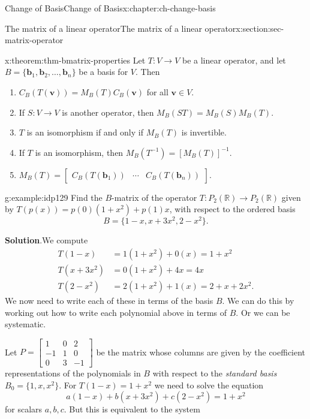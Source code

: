 \documentclass[oneside,10pt,]{book}
\newcommand{\blocktitlefont}{\relax}
\numberwithin{equation}{section}
\newcommand{\bbm}{\begin{bmatrix}}
\newcommand{\ebm}{\end{bmatrix}}
\newcommand{\R}{\mathbb{R}}
\newcommand{\vv}{\mathbf{v}}
\newcommand{\basis}[2]{\{\mathbf{#1}_1,\mathbf{#1}_2,\ldots,\mathbf{#1}_{#2}\}}
\newcommand{\amp}{&}
\begin{document}
\begin{chapterptx}{Change of Basis}{}{Change of Basis}{}{}{x:chapter:ch-change-basis}
\begin{sectionptx}{The matrix of a linear operator}{}{The matrix of a linear operator}{}{}{x:section:sec-matrix-operator}
\begin{theorem}{}{}{x:theorem:thm-bmatrix-properties}%
Let \(T:V\to V\) be a linear operator, and let \(B=\basis{b}{n}\) be a basis for \(V\). Then%
\begin{enumerate}
\item{}\(C_B(T(\vv))=M_B(T)C_B(\vv)\) for all \(\vv\in V\).%
\item{}If \(S:V\to V\) is another operator, then \(M_B(ST)=M_B(S)M_B(T)\).%
\item{}\(T\) is an isomorphism if and only if \(M_B(T)\) is invertible.%
\item{}If \(T\) is an isomorphism, then \(M_B(T^{-1}) = [M_B(T)]^{-1}\).%
\item{}\(M_B(T)=\bbm C_B(T(\mathbf{b}_1)) \amp \cdots \amp C_B(T(\mathbf{b}_n))\ebm\).%
\end{enumerate}
%
\end{theorem}
\begin{example}{}{g:example:idp129}%
Find the \(B\)-matrix of the operator \(T:P_2(\R)\to P_2(\R)\) given by \(T(p(x))=p(0)(1+x^2)+p(1)x\), with respect to the ordered basis%
\begin{equation*}
B = \{1-x, x+3x^2, 2-x^2\}\text{.}
\end{equation*}
%
\par\smallskip%
\noindent\textbf{\blocktitlefont Solution}.\hypertarget{g:solution:idp130}{}\quad{}We compute%
\begin{align*}
T(1-x) \amp = 1(1+x^2)+0(x) = 1+x^2\\
T(x+3x^2) \amp = 0(1+x^2)+4x=4x\\
T(2-x^2) \amp = 2(1+x^2)+1(x) = 2+x+2x^2\text{.}
\end{align*}
We now need to write each of these in terms of the basis \(B\). We can do this by working out how to write each polynomial above in terms of \(B\). Or we can be systematic.%
\par
Let \(P = \bbm 1\amp 0\amp 2\\-1\amp 1\amp 0\\0\amp 3\amp -1\ebm\) be the matrix whose columns are given by the coefficient representations of the polynomials in \(B\) with respect to the \emph{standard basis} \(B_0=\{1,x,x^2\}\). For \(T(1-x)=1+x^2\) we need to solve the equation%
\begin{equation*}
a(1-x)+b(x+3x^2)+c(2-x^2)=1+x^2
\end{equation*}
for scalars \(a,b,c\). But this is equivalent to the system%
\begin{align*}

\end{align*}
\end{example}
\end{sectionptx}
\end{chapterptx}
\end{document}
